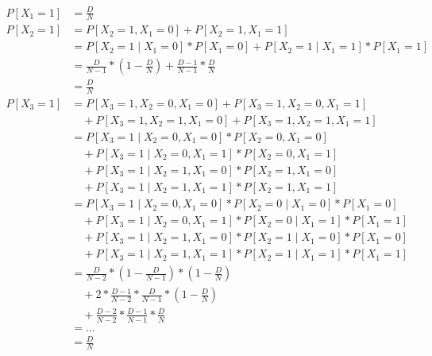 \documentclass{article}
\begin{document}
  \begin{align}
    P[X_1 = 1]  &= \frac{D}{N}\\
    P[X_2 = 1]  &= P[X_2 = 1 , X_1 = 0] + P[X_2 = 1 , X_1 = 1] \\
                &= P[X_2 = 1 \mid X_1 = 0]*P[X_1 = 0] + P[X_2 = 1 \mid X_1 = 1]*P[X_1 = 1] \\
                &= \frac{D}{N-1}*(1-\frac{D}{N}) + \frac{D-1}{N-1}*\frac{D}{N} \\
                &= \frac{D}{N} \\
    P[X_3 = 1]  &= P[X_3 = 1 , X_2 = 0 , X_1 = 0 ] + P[X_3 = 1 , X_2 = 0 , X_1 = 1 ] \\
                & \quad + P[X_3 = 1 , X_2 = 1 , X_1 = 0 ] + P[X_3 = 1 , X_2 = 1 , X_1 = 1 ] \\
                &= P[X_3 = 1 \mid  X_2 = 0, X_1 = 0]*P[X_2 = 0,X_1 = 0] \\
                & \quad + P[X_3 = 1 \mid  X_2 = 0, X_1 = 1]*P[X_2 = 0,X_1 = 1] \\
                & \quad + P[X_3 = 1 \mid  X_2 = 1, X_1 = 0]*P[X_2 = 1,X_1 = 0] \\
                & \quad + P[X_3 = 1 \mid  X_2 = 1, X_1 = 1]*P[X_2 = 1,X_1 = 1] \\
                &= P[X_3 = 1 \mid  X_2 = 0, X_1 = 0]*P[X_2 = 0 \mid X_1 = 0] * P[X_1 = 0]\\
                & \quad + P[X_3 = 1 \mid  X_2 = 0, X_1 = 1]*P[X_2 = 0 \mid X_1 = 1] * P[X_1 = 1] \\
                & \quad + P[X_3 = 1 \mid  X_2 = 1, X_1 = 0]*P[X_2 = 1 \mid X_1 = 0] * P[X_1 = 0]\\
                & \quad + P[X_3 = 1 \mid  X_2 = 1, X_1 = 1]*P[X_2 = 1 \mid X_1 = 1] * P[X_1 = 1]\\
                &= \frac{D}{N-2}*(1-\frac{D}{N-1}) * (1-\frac{D}{N})\\
                & \quad + 2*\frac{D-1}{N-2}*\frac{D}{N-1} * (1-\frac{D}{N})\\
                & \quad + \frac{D-2}{N-2}*\frac{D-1}{N-1} * \frac{D}{N}\\
                &= ... \\
                &= \frac{D}{N}
  \end{align}

	\nocite{prob2017}

  
  
\end{document}
